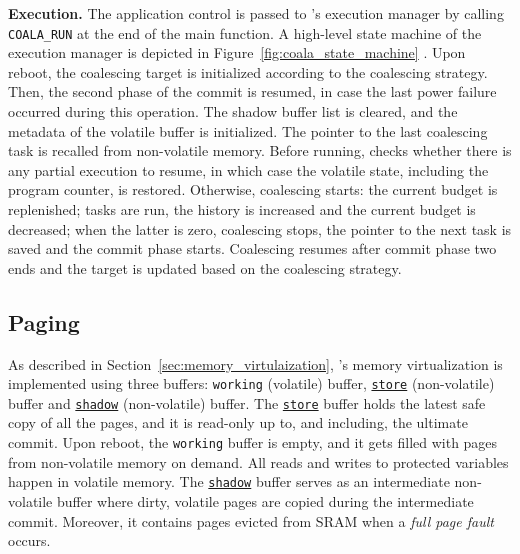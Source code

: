 \textbf{Execution.} The application control is passed to \sys's execution manager by calling \texttt{COALA\_RUN} at the end of the main function. A high-level state machine of the execution manager is depicted in Figure~\ref{fig:coala_state_machine} . Upon reboot, the coalescing target is initialized according to the coalescing strategy. Then, the second phase of the commit is resumed, in case the last power failure occurred during this operation. The shadow buffer list is cleared, and the metadata of the volatile buffer is initialized. The pointer to the last coalescing task is recalled from non-volatile memory. Before running, \sys checks whether there is any partial execution to resume, in which case the volatile state, including the program counter, is restored. Otherwise, coalescing starts: the current budget is replenished; tasks are run, the history is increased and the current budget is decreased; when the latter is zero, coalescing stops, the pointer to the next task is saved and the commit phase starts. Coalescing resumes after commit phase two ends and the target is updated based on the coalescing strategy. 

\subsection{Paging}

As described in Section~\ref{sec:memory_virtulaization}, \sys's memory virtualization is implemented using three buffers: \texttt{working} (volatile) buffer, \texttt{\underline{store}} (non-volatile) buffer and \texttt{\underline{shadow}} (non-volatile) buffer. The \texttt{\underline{store}} buffer holds the latest safe copy of all the pages, and it is read-only up to, and including, the ultimate commit. Upon reboot, the \texttt{working} buffer is empty, and it gets filled with pages from non-volatile memory on demand. All reads and writes to protected variables happen in volatile memory. The \texttt{\underline{shadow}} buffer serves as an intermediate non-volatile buffer where dirty, volatile pages are copied during the intermediate commit. Moreover, it contains pages evicted from SRAM when a \emph{full page fault} occurs.


